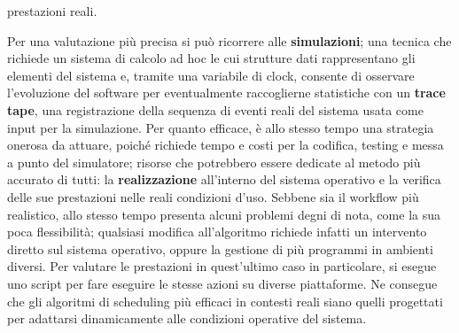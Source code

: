 prestazioni reali.\par
Per una valutazione più precisa si può ricorrere alle \textbf{simulazioni}; una tecnica che richiede un sistema di calcolo ad hoc le cui strutture dati
rappresentano gli elementi del sistema e, tramite una variabile di clock, consente di osservare l'evoluzione del software per eventualmente raccoglierne
statistiche con un \textbf{trace tape}, una registrazione della sequenza di eventi reali del sistema usata come input per la simulazione. Per quanto
efficace, è allo stesso tempo una strategia onerosa da attuare, poiché richiede tempo e costi per la codifica, testing e messa a punto del simulatore; 
risorse che potrebbero essere dedicate al metodo più accurato di tutti: la \textbf{realizzazione} all'interno del sistema operativo e la verifica delle
sue prestazioni nelle reali condizioni d'uso. Sebbene sia il workflow più realistico, allo stesso tempo presenta alcuni problemi degni di nota, come
la sua poca flessibilità; qualsiasi modifica all'algoritmo richiede infatti un intervento diretto sul sistema operativo, oppure la gestione di più
programmi in ambienti diversi. Per valutare le prestazioni in quest'ultimo caso in particolare, si esegue uno script per fare eseguire le stesse azioni
su diverse piattaforme. Ne consegue che gli algoritmi di scheduling più efficaci in contesti reali siano quelli progettati per adattarsi dinamicamente
alle condizioni operative del sistema.